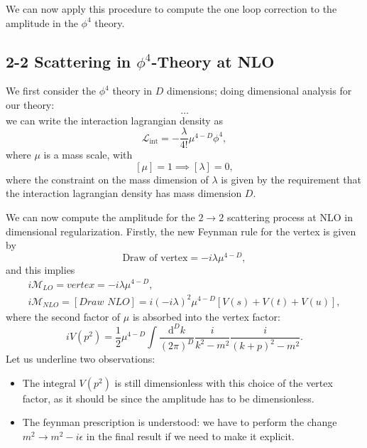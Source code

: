 We can now apply this procedure to compute the one loop correction to the amplitude in the \(\phi^4\) theory.

\subsection{2-2 Scattering in \(\phi^4\)-Theory at NLO}

We first consider the \(\phi^4\) theory in \(D\) dimensions; doing dimensional analysis for our theory:
\[
    \dots
\]
we can write the interaction lagrangian density as
\[
    \mathcal{L}_{\text{int}} = - \frac{\lambda}{4!} \mu^{4-D} \phi^4,
\]
where \(\mu\) is a mass scale, with
\[
    [\mu] = 1 \implies [\lambda] = 0,
\]
where the constraint on the mass dimension of \(\lambda\) is given by the requirement that the interaction lagrangian density has mass dimension \(D\).

We can now compute the amplitude for the \(2 \to 2\) scattering process at NLO in dimensional regularization. Firstly, the new Feynman rule for the vertex is given by
\[
    \text{Draw of vertex} = - i \lambda \mu^{4-D},
\]
and this implies
\[
    \begin{aligned}
        i \mathcal{M}_{LO} = vertex = - i \lambda \mu^{4-D}, \\
        i \mathcal{M}_{NLO} = [\textit{Draw NLO}] = i (-i \lambda)^2 \mu^{4-D}[V(s) + V(t) + V(u)],
    \end{aligned}
\]
where the second factor of \(\mu\) is absorbed into the vertex factor:
\[
    i V(p^2) = \frac{1}{2} \mu^{4-D} \int \frac{\mathrm{d}^D k}{(2\pi)^D} \frac{i}{k^2 - m^2} \frac{i}{(k+p)^2 - m^2}.
\]
Let us underline two observations:
\begin{itemize}
    \item The integral \(V(p^2)\) is still dimensionless with this choice of the vertex factor, as it should be since the amplitude has to be dimensionless.
    \item The feynman prescription is understood: we have to perform the change \(m^2 \to m^2 - i \epsilon\) in the final result if we need to make it explicit.
\end{itemize}


